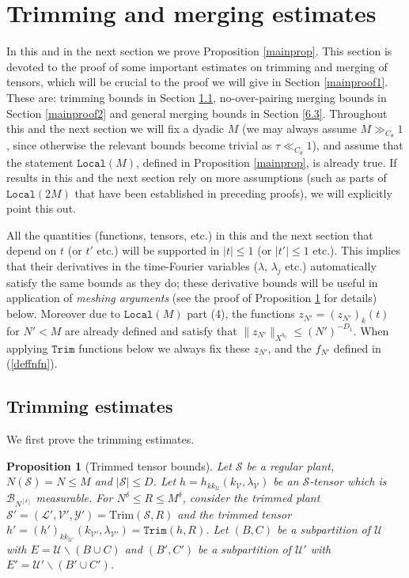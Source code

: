 \documentclass[11 pt,reqno]{amsart}
\newtheorem{prop}[thm]{Proposition}
\theoremstyle{definition}
\theoremstyle{remark}
\numberwithin{equation}{section}
\newcommand{\Sc}{\mathcal{S}}
\newcommand{\Lc}{\mathcal{L}}
\newcommand{\Uc}{\mathcal{U}}
\newcommand{\Bc}{\mathcal{B}}
\newcommand{\Vc}{\mathcal{V}}
\newcommand{\Yc}{\mathcal{Y}}
\begin{document}
{   \section{Trimming and merging estimates}\label{mainproof} In this and in the next section we prove Proposition \ref{mainprop}. This section is devoted to the proof of some important estimates on trimming and merging of tensors, which will be crucial to the proof we will give in Section \ref{mainproof1}. These are: trimming bounds in Section \ref{6.1}, no-over-pairing merging bounds in Section \ref{mainproof2} and general merging bounds in Section \ref{6.3}. Throughout this and the next section we will fix a dyadic $M$ (we may always assume $M\gg_{C_\theta}1$, since otherwise the relevant bounds become trivial as $\tau\ll_{C_\theta}1$), and assume that the statement $\mathtt{Local}(M)$, defined in Proposition \ref{mainprop}, is already true. If results in this and the next section rely on more assumptions (such as parts of $\mathtt{Local}(2M)$ that have been established in preceding proofs), we will explicitly point this out.
  
All the quantities (functions, tensors, etc.) in this and the next section that depend on $t$ (or $t'$ etc.) will be supported in $|t|\leq1$ (or $|t'|\leq 1$ etc.). This implies that their derivatives in the time-Fourier variables ($\lambda$, $\lambda_j$ etc.) automatically satisfy the same bounds as they do; these derivative bounds will be useful in application of \emph{meshing arguments} (see the proof of Proposition \ref{trimbd} for details) below. Moreover due to $\mathtt{Local}(M)$ part (4), the functions $z_{N'}=(z_{N'})_k(t)$ for $N'<M$ are already defined and satisfy that $\|z_{N'}\|_{X^{b_0}}\leq (N')^{-D_1}$. When applying $\mathtt{Trim}$ functions below we always fix these $z_{N'}$, and the $f_{N'}$ defined in (\ref{deffnfn}).
  \subsection{Trimming estimates}\label{6.1} We first prove the trimming estimates.
  \begin{prop}[Trimmed tensor bounds]\label{trimbd} Let $\Sc$ be a regular plant, $N(\Sc)=N\leq M$ and $|\Sc|\leq D$. Let $h=h_{kk_\Uc}(k_\Vc,\lambda_\Vc)$ be an $\Sc$-tensor which is $\Bc_{N^{[\delta]}}$ measurable. For $N^\delta\leq R\leq M^\delta$, consider the trimmed plant $\Sc'=(\Lc',\Vc',\Yc')=\mathrm{Trim}(\Sc,R)$ and the trimmed tensor $h'=(h')_{kk_{\Uc'}}(k_{\Vc'},\lambda_{\Vc'})=\mathtt{Trim}(h,R)$. Let $(B,C)$ be a subpartition of $\Uc$ with $E=\Uc\backslash(B\cup C)$ and $(B',C')$ be a subpartition of $\Uc'$ with $E'=\Uc'\backslash(B'\cup C')$.
  

\end{prop}}
\end{document}
